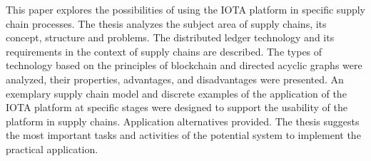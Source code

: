

This paper explores the possibilities of using the IOTA platform in specific supply chain processes. The thesis analyzes the subject area of supply chains, its concept, structure and problems. The distributed ledger technology and its requirements in the context of supply chains are described. The types of technology based on the principles of blockchain and directed acyclic graphs were analyzed, their properties, advantages, and disadvantages were presented. An exemplary supply chain model and discrete examples of the application of the IOTA platform at specific stages were designed to support the usability of the platform in supply chains. Application alternatives provided. The thesis suggests the most important tasks and activities of the potential system to implement the practical application.

